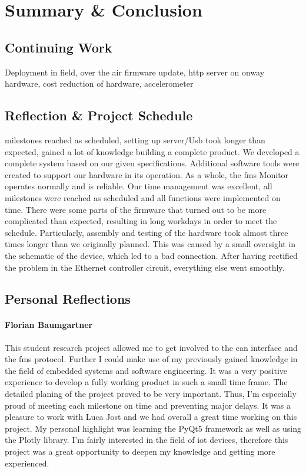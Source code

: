 \chapter{Summary \& Conclusion}

\section{Continuing Work}
Deployment in field, over the air firmware update, http server on onway hardware, cost reduction of hardware, accelerometer


\section{Reflection \& Project Schedule}
milestones reached as scheduled, setting up server/Usb took longer than expected, gained a lot of knowledge building a complete product.  
We developed a complete system based on our given specifications. Additional software tools were created to support our hardware in its operation. As a whole, the \acrfull{fms} Monitor operates normally and is reliable. 
Our time management was excellent, all milestones were reached as scheduled and all functions were implemented on time. There were some parts of the firmware that turned out to be more complicated than expected, resulting in long workdays in order to meet the schedule. Particularly, assembly and testing of the hardware took almost three times longer than we originally planned. This was caused by a small oversight in the schematic of the device, which led to a bad connection. After having rectified the problem in the Ethernet controller circuit, everything else went smoothly.

\newpage
\section{Personal Reflections}

\subsubsection{Florian Baumgartner}
This student research project allowed me to get involved to the \acrshort{can} interface and the \acrshort{fms} protocol. Further I could make use of my previously gained knowledge in the field of embedded systems and software engineering. It was a very positive experience to develop a fully working product in such a small time frame. The detailed planing of the project proved to be very important. Thus, I'm especially proud of meeting each milestone on time and preventing major delays. \newline
It was a pleasure to work with Luca Jost and we had overall a great time working on this project. My personal highlight was learning the PyQt5 framework as well as using the Plotly library. I'm fairly interested in the field of \acrshort{iot} devices, therefore this project was a great opportunity to deepen my knowledge and getting more experienced.

